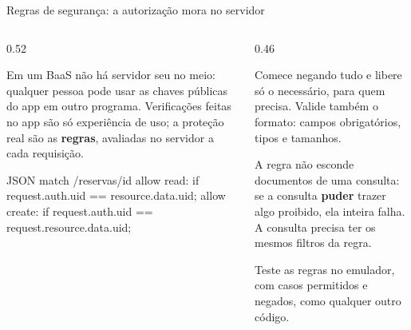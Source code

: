 \begin{frame}[fragile]{Regras de segurança: a autorização mora no servidor}
  \begin{columns}[T]
    \begin{column}{0.52\textwidth}
      \begin{conceito}
        Em um BaaS não há servidor seu no meio: qualquer pessoa pode usar as chaves públicas do app em outro programa. Verificações feitas no app são só experiência de uso; a proteção real são as \textbf{regras}, avaliadas no servidor a cada requisição.
      \end{conceito}
\begin{codigo}[title=firestore.rules (trecho)]{JSON}
match /reservas/{id} {
  allow read: if request.auth.uid == resource.data.uid;
  allow create: if request.auth.uid
                   == request.resource.data.uid;
}
\end{codigo}
    \end{column}
    \begin{column}{0.46\textwidth}
      \begin{definicao}
        Comece negando tudo e libere só o necessário, para quem precisa. Valide também o formato: campos obrigatórios, tipos e tamanhos.
      \end{definicao}
      \begin{atencao}
        A regra não esconde documentos de uma consulta: se a consulta \textbf{puder} trazer algo proibido, ela inteira falha. A consulta precisa ter os mesmos filtros da regra.
      \end{atencao}
      \begin{dica}
        Teste as regras no emulador, com casos permitidos e negados, como qualquer outro código.
      \end{dica}
    \end{column}
  \end{columns}
\end{frame}

